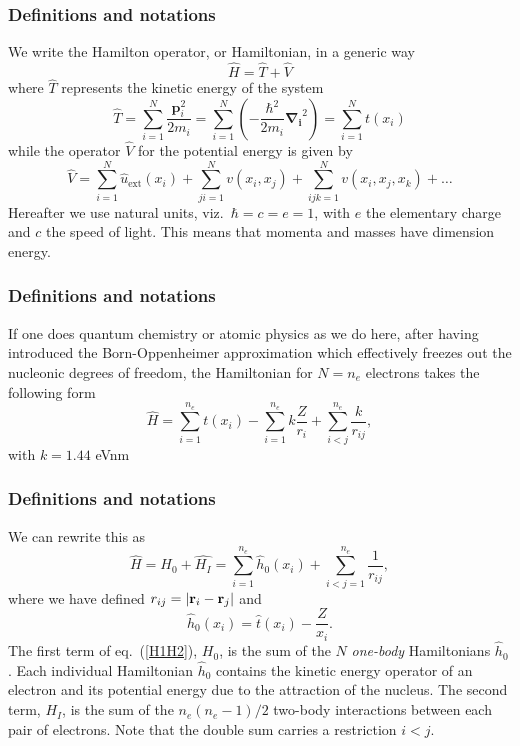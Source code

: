 \documentclass[compress]{beamer}
\begin{document}
\frame
{
  \frametitle{Definitions and notations}
\begin{small}
{\scriptsize
We write the Hamilton operator, or Hamiltonian,  in a generic way 
\[
	\hat{H} = \hat{T} + \hat{V} 
\]
where $\hat{T}$  represents the kinetic energy of the system
\[
	\hat{T} = \sum_{i=1}^N \frac{\mathbf{p}_i^2}{2m_i} = \sum_{i=1}^N \left( -\frac{\hbar^2}{2m_i} \mathbf{\nabla_i}^2 \right) =
		\sum_{i=1}^N t(x_i)
\]
while the operator $\hat{V}$ for the potential energy is given by
\begin{equation}
	\hat{V} = \sum_{i=1}^N \hat{u}_{\mathrm{ext}}(x_i) + \sum_{ji=1}^N v(x_i,x_j)+\sum_{ijk=1}^Nv(x_i,x_j,x_k)+\dots
\label{eq:firstv}
\end{equation}
Hereafter we use natural units, viz.~$\hbar=c=e=1$, with $e$ the elementary charge and $c$ the speed of light. This means that momenta and masses
have dimension energy. 
}
\end{small}
}
\frame
{
  \frametitle{Definitions and notations}
\begin{small}
{\scriptsize
If one does quantum chemistry or atomic physics as we do here, after having introduced the  Born-Oppenheimer approximation which effectively freezes out the nucleonic degrees
of freedom, the Hamiltonian for $N=n_e$ electrons takes the following form 
\[
  \hat{H} = \sum_{i=1}^{n_e} t(x_i) 
  - \sum_{i=1}^{n_e} k\frac{Z}{r_i} + \sum_{i<j}^{n_e} \frac{k}{r_{ij}},
\]
with $k=1.44$ eVnm
}
\end{small}
}

\frame
{
  \frametitle{Definitions and notations}
\begin{small}
{\scriptsize
 We can rewrite this as
\begin{equation}
    \hat{H} = \hat{H_0} + \hat{H_I} 
    = \sum_{i=1}^{n_e}\hat{h}_0(x_i) + \sum_{i<j=1}^{n_e}\frac{1}{r_{ij}},
\label{H1H2}
\end{equation}
where  we have defined $r_{ij}=| {\bf r}_i-{\bf r}_j|$ and
\begin{equation}
  \hat{h}_0(x_i) =  \hat{t}(x_i) - \frac{Z}{x_i}.
\label{hi}
\end{equation}
The first term of eq.~(\ref{H1H2}), $H_0$, is the sum of the $N$
\emph{one-body} Hamiltonians $\hat{h}_0$. Each individual
Hamiltonian $\hat{h}_0$ contains the kinetic energy operator of an
electron and its potential energy due to the attraction of the
nucleus. The second term, $H_I$, is the sum of the $n_e(n_e-1)/2$
two-body interactions between each pair of electrons. Note that the double sum carries a restriction $i<j$.
}
\end{small}
}
\end{document}
